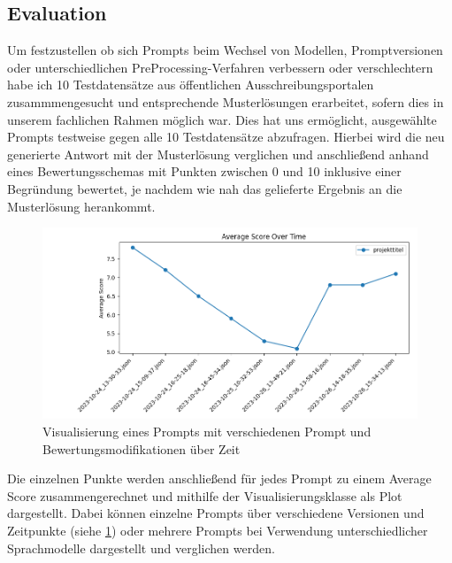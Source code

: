 \subsection{Evaluation} 
\label{chap:Evaluation}   
Um festzustellen ob sich Prompts beim Wechsel von Modellen, Promptversionen oder unterschiedlichen
PreProcessing-Verfahren verbessern oder verschlechtern habe ich 10 Testdatensätze aus öffentlichen
Ausschreibungsportalen zusammmengesucht und entsprechende Musterlösungen erarbeitet, sofern dies in unserem fachlichen
Rahmen möglich war. Dies hat uns ermöglicht, ausgewählte Prompts testweise gegen alle 10 Testdatensätze abzufragen.
Hierbei wird die neu generierte Antwort mit der Musterlösung verglichen und anschließend anhand eines Bewertungsschemas
mit Punkten zwischen 0 und 10 inklusive einer Begründung bewertet, je nachdem wie nah das gelieferte Ergebnis an die
Musterlösung herankommt.    

\begin{figure}[h]
    \centering
    \includegraphics[width=1\textwidth]{figures/02_Prompt_Evaluierung.png}
    \caption{Visualisierung eines Prompts mit verschiedenen Prompt und Bewertungsmodifikationen über Zeit}
    \label{figure:02_Prompt_Evaluierung}     %
\end{figure}

Die einzelnen Punkte werden anschließend für jedes Prompt zu einem Average Score zusammengerechnet und mithilfe der
Visualisierungsklasse als Plot dargestellt. Dabei können einzelne Prompts über verschiedene Versionen und Zeitpunkte
(siehe \ref{figure:02_Prompt_Evaluierung}) oder mehrere Prompts bei Verwendung unterschiedlicher Sprachmodelle
dargestellt und verglichen werden.


